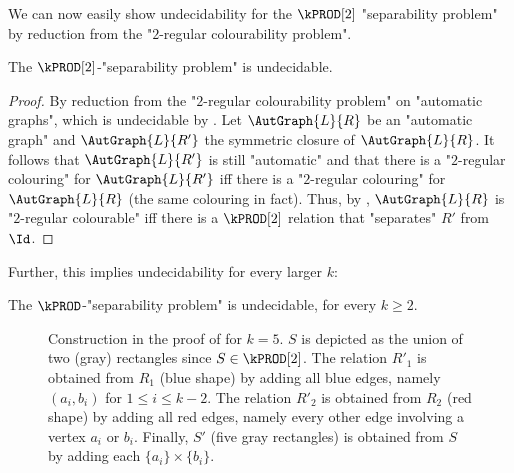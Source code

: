 We can now easily show undecidability for the $\kPROD[2]$ "separability problem" by reduction from the "$2$-regular colourability problem".
\begin{lemma}\AP\label{lem:aut-2prod-sep-undec}
    The $\kPROD[2]$-"separability problem" is undecidable.
\end{lemma}
\begin{proof}
    By reduction from the "$2$-regular colourability problem" on "automatic graphs", which is undecidable by . Let $\AutGraph{L}{R}$ be an "automatic graph" and $\AutGraph{L}{R'}$ the symmetric closure of $\AutGraph{L}{R}$. It follows that $\AutGraph{L}{R'}$ is still "automatic" and that there is a "$2$-regular colouring" for $\AutGraph{L}{R'}$ if{f} there is a "$2$-regular colouring" for $\AutGraph{L}{R}$ (the same colouring in fact).
    Thus, by , $\AutGraph{L}{R}$ is "$2$-regular colourable" if{f} 
    there is a $\kPROD[2]$ relation that "separates" $R'$ from $\Id$.
\end{proof}

Further, this implies undecidability for every larger $k$:
\begin{theorem}
    \AP\label{thm:kprod-undecidable}
    The $\kPROD$-"separability problem" is undecidable, for every $k \geq 2$.
\end{theorem}
\begin{figure}[htb]
    \centering
    \begin{tikzpicture}
        
	\end{tikzpicture}
    \caption{
        \AP\label{fig:2prod-to-kprod}
        Construction in the proof of  for $k = 5$. $S$ is depicted as the union of two (gray) rectangles since $S \in \kPROD[2]$.
        The relation $R'_1$ is obtained from $R_1$ (blue shape) by adding all blue edges,
        namely $(a_i, b_i)$ for $1\leq i \leq k-2$. The relation $R'_2$ is obtained from $R_2$ (red shape) by adding
        all red edges, namely every other edge involving a vertex $a_i$ or $b_i$.
        Finally, $S'$ (five gray rectangles) is obtained from $S$ by adding
        each $\{a_i\} \times \{b_i\}$.
    }
\end{figure}

